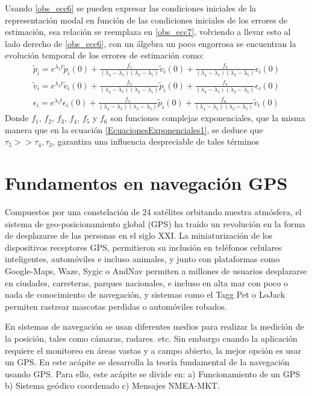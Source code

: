 \documentclass[10pt]{report}
\numberwithin{equation}{chapter}
\numberwithin{algorithm}{chapter}
\begin{document}
Usando \eqref{obs_ecc6} se pueden expresar las condiciones iniciales de la representación modal en función de las condiciones iniciales de los errores de estimación, esa relación se reemplaza en \eqref{obs_ecc7}, volviendo a llevar esto al lado derecho de \eqref{obs_ecc6}, con un álgebra un poco engorrosa se encuentran la evolución temporal de los errores de estimación como:
\begin{equation}\label{obs_ecc9}
\begin{array}{c}
\tilde{p}_i=e^{\lambda_3t}\tilde{p}_i(0)+\frac{f_1}{(\lambda_4-\lambda_5)(\lambda_3-\lambda_5)}\tilde{v}_i(0)+\frac{f_2}{(\lambda_4-\lambda_5)(\lambda_3-\lambda_5)}\epsilon_i(0)\\
\tilde{v}_i=e^{\lambda_4t}\tilde{v}_i(0)+\frac{f_3}{(\lambda_4-\lambda_5)(\lambda_3-\lambda_5)}\tilde{p}_i(0)+\frac{f_4}{(\lambda_4-\lambda_5)(\lambda_3-\lambda_5)}\epsilon_i(0)\\
\epsilon_i=e^{\lambda_5t}\epsilon_i(0)+\frac{f_5}{(\lambda_4-\lambda_5)(\lambda_3-\lambda_5)}\tilde{p}_i(0)+\frac{f_6}{(\lambda_4-\lambda_5)(\lambda_3-\lambda_5)}\tilde{v}_i(0)
\end{array}
\end{equation}
Donde $f_1$, $f_2$, $f_3$, $f_4$, $f_5$ y $f_6$ son funciones complejas exponenciales, que la misma manera que en la ecuación \eqref{EcuacionesExponenciales1}, se deduce que $\tau_5>>\tau_4,\tau_3$, garantiza una influencia despreciable de tales términos
\newpage
\section{Fundamentos en navegación GPS}\label{FundamentosEnNavegacionGPS}
Compuestos por una constelación de 24 satélites orbitando nuestra atmósfera, el sistema de geo-posicionamiento global (GPS) ha traído un revolución en la forma de desplazarse de las personas en el siglo XXI. La miniaturización de los dispositivos receptores GPS, permitieron su inclusión en teléfonos celulares inteligentes, automóviles e incluso animales, y junto con plataformas como Google-Maps, Waze, Sygic o AndNav permiten a millones de usuarios desplazarse en ciudades, carreteras, parques nacionales, e incluso en alta mar con poco o nada de conocimiento de navegación, y sistemas como el Tagg Pet o LoJack permiten rastrear mascotas perdidas o automóviles robados.\par
En sistemas de navegación se usan diferentes medios para realizar la medición de la posición, tales como cámaras, radares. etc. Sin embargo cuando la aplicación requiere el monitoreo en áreas vastas y a campo abierto, la mejor opción es usar un GPS. En este acápite se desarrolla la teoría fundamental de la navegación usando GPS. Para ello, este acápite se divide en: a) Funcionamiento de un GPS b) Sistema geódico coordenado c) Mensajes NMEA-MKT.
\end{document}
